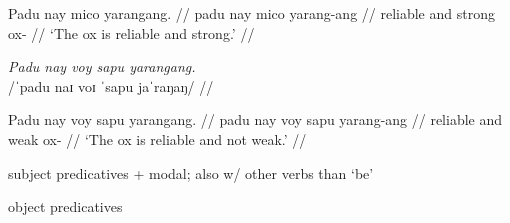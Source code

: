 \documentclass[12pt,a4paper]{scrartcl}
\begin{document}
\gla Padu nay mico yarangang. //
\glb padu nay mico yarang-ang //
\glc reliable and strong ox-\Aarg{} //
\glft `The ox is reliable and strong.' //
\endgl\xe

\ex\begingl
\glpreamble \textit{Padu nay voy sapu yarangang.} \\
	/ˈpadu naɪ voɪ ˈsapu jaˈraŋaŋ/ //

\gla Padu nay voy sapu yarangang. //
\glb padu nay voy sapu yarang-ang //
\glc reliable and \Neg{} weak ox-\Aarg{} //
\glft `The ox is reliable and not weak.' //
\endgl\xe

\ex subject predicatives + modal; also w/ other verbs than `be' \xe

\ex object predicatives \xe

\vfill

\begin{multicols}{2}
\printglossary[style=mysuper,type=\leipzigtype]
\end{multicols}
\end{document}
